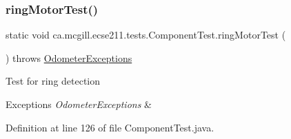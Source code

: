 \mbox{\label{enumca_1_1mcgill_1_1ecse211_1_1tests_1_1_component_test_a1ecca45b47067d825683cf46dcf22b62}} 
\subsubsection{\texorpdfstring{ring\+Motor\+Test()}{ringMotorTest()}}
{\footnotesize\ttfamily static void ca.\+mcgill.\+ecse211.\+tests.\+Component\+Test.\+ring\+Motor\+Test (\begin{DoxyParamCaption}{ }\end{DoxyParamCaption}) throws \hyperlink{classca_1_1mcgill_1_1ecse211_1_1odometer_1_1_odometer_exceptions}{Odometer\+Exceptions}\hspace{0.3cm}{\ttfamily [static]}}

Test for ring detection


\begin{DoxyExceptions}{Exceptions}
{\em Odometer\+Exceptions} & \\
\hline
\end{DoxyExceptions}


Definition at line 126 of file Component\+Test.\+java.


